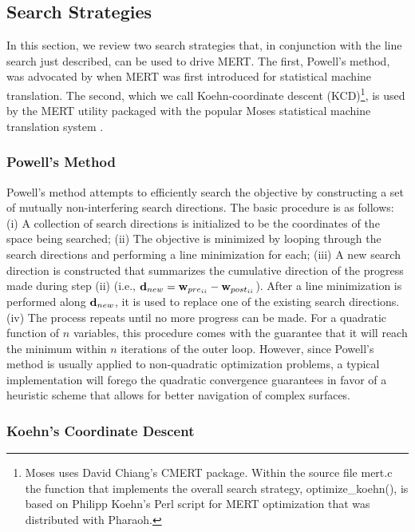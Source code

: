 \documentclass[11pt]{article}
\begin{document}
\subsection{Search Strategies}

In this section, we review two search strategies that, in conjunction with the line search just described, can be used to drive MERT. The first, Powell's method, was advocated by  when MERT was first introduced for statistical machine translation. The second, which we call Koehn-coordinate descent (KCD)\footnote{Moses uses David Chiang's CMERT package. Within the source file mert.c the function that implements the overall search strategy, optimize\_koehn(), is based on Philipp Koehn's Perl script for MERT optimization that was distributed with Pharaoh. }, is used by the MERT utility packaged with the popular Moses statistical machine translation system \cite{koehn2007}. 

\subsubsection{Powell's Method}

Powell's method \cite{press2007} attempts to efficiently search the objective by constructing a set of mutually non-interfering search directions. The basic procedure is as follows: (i) A collection of search directions is initialized to be the coordinates of the space being searched; (ii) The objective is minimized by looping through the search directions and performing a line minimization for each; (iii) A new search direction is constructed that summarizes the cumulative direction of the progress made during step (ii) (i.e., \mbox{${\bf d}_{new} = {\bf w}_{pre_{ii}} - {\bf w}_{post_{ii}}$}). After a line minimization is performed along \mbox{${\bf d}_{new}$}, it is used to replace one of the existing search directions. (iv) The process repeats until no more progress can be made. For a quadratic  function of \mbox{$n$} variables, this procedure comes with the guarantee that it will reach the minimum within \mbox{$n$} iterations of the outer loop. However, since Powell's method is usually applied to non-quadratic optimization problems, a typical implementation will forego the quadratic convergence guarantees in favor of a heuristic scheme that allows for better navigation of complex surfaces. 

\subsubsection{Koehn's Coordinate Descent}
\end{document}
